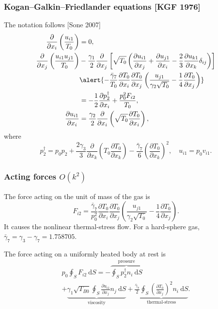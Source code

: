 \documentclass[mathserif]{beamer} %
\newcommand{\dd}{\:\mathrm{d}}
\newcommand{\pder}[2][]{\frac{\partial#1}{\partial#2}}
\newcommand{\OO}[1]{O(#1)}
\begin{document}
\begin{frame}
    \frametitle{Kogan--Galkin--Friedlander equations [KGF 1976]}
    The notation follows [Sone 2007]
    \begin{align}
        \pder{x_i}\left(\frac{u_{i1}}{T_0}\right) &= 0, \label{eq:asymptotic1} \\
        \pder{x_j}\left(\frac{u_{i1}u_{j1}}{T_0}\right)
            &-\frac{\gamma_1}2\pder{x_j}\left[\sqrt{T_0}\left(
                \pder[u_{i1}]{x_j} + \pder[u_{j1}]{x_i} - \frac23\pder[u_{k1}]{x_k}\delta_{ij}
            \right)\right] \notag\\
            &\alert{- \frac{\bar{\gamma}_7}{T_0}\pder[T_0]{x_i}\pder[T_0]{x_j}
                \left(\frac{u_{j1}}{\gamma_2\sqrt{T_0}} - \frac{1}4\pder[T_0]{x_j}\right)} \notag\\
            &= -\frac12\pder[p_2^\dag]{x_i} + \frac{p_0^2 F_{i2}}{T_0}, \label{eq:asymptotic2} \\
        \pder[u_{i1}]{x_i} &= \frac{\gamma_2}2\pder{x_i}\left(\sqrt{T_0}\pder[T_0]{x_i}\right), \label{eq:asymptotic3}
    \end{align}
    where
    \begin{equation}\label{eq:dag_pressure}
        p_2^\dag = p_0 p_2
            + \frac{2\gamma_3}{3}\pder{x_k}\left(T_0\pder[T_0]{x_k}\right)
            - \frac{\bar{\gamma}_7}{6}\left(\pder[T_0]{x_k}\right)^2, \quad u_{i1} = p_0v_{i1}.
    \end{equation}
\end{frame}

\begin{frame}
    \frametitle{Acting forces \(\OO{k^2}\)}
    The force acting on the unit of mass of the gas is
    \begin{equation}\label{eq:gamma7_force}
        F_{i2} = \frac{\bar{\gamma}_7}{p_0^2}\pder[T_0]{x_i}\pder[T_0]{x_j}\left(\frac{u_{j1}}{\gamma_2\sqrt{T_0}}
            - \frac{1}4\pder[T_0]{x_j}\right).
    \end{equation}
    It causes the \alert{nonlinear thermal-stress flow}.
    For a hard-sphere gas, \(\bar{\gamma}_7 = \gamma_3 - \gamma_7 = 1.758705\).
    \vspace{20pt}\pause

    The force acting on a uniformly heated body at rest is
    \begin{multline}\label{eq:force:terms}
        p_0 \oint_S F_{i2} \dd{S} =
            - \overbrace{ \oint_S p_2^\dag n_i \dd{S} }^\text{pressure} \\
            + \underbrace{ \gamma_1 \sqrt{T_{B0}} \oint_S \pder[u_{i1}]{x_j} n_j \dd{S} }_\text{viscosity}
            + \underbrace{ \frac{\bar{\gamma}_7}{2} \oint_S \left(\pder[T_0]{x_j}\right)^2 n_i \dd{S} }_\text{thermal-stress}.
    \end{multline}
\end{frame}
\end{document}
